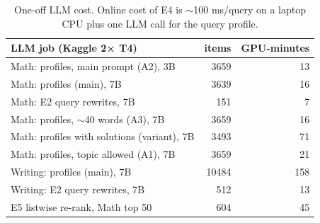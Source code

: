 \begin{table}[t]
\centering\small
\caption{One-off LLM cost. Online cost of E4 is $\sim$100 ms/query on a laptop CPU plus one LLM call for the query profile.}
\label{tab:cost}
\begin{tabular}{lrr}
\toprule
LLM job (Kaggle 2× T4) & items & GPU-minutes \\
\midrule
Math: profiles, main prompt (A2), 3B & 3659 & 13 \\
Math: profiles (main), 7B & 3639 & 16 \\
Math: E2 query rewrites, 7B & 151 & 7 \\
Math: profiles, $\sim$40 words (A3), 7B & 3659 & 16 \\
Math: profiles with solutions (variant), 7B & 3493 & 71 \\
Math: profiles, topic allowed (A1), 7B & 3659 & 21 \\
Writing: profiles (main), 7B & 10484 & 158 \\
Writing: E2 query rewrites, 7B & 512 & 13 \\
E5 listwise re-rank, Math top 50 & 604 & 45 \\
\bottomrule
\end{tabular}
\end{table}
